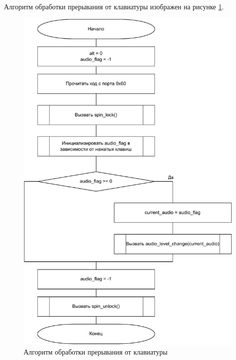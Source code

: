 Алгоритм обработки прерывания от клавиатуры изображен на рисунке \ref{fig:kb_handler}.
\begin{figure}[h!btp]
	\centering
	\includegraphics[scale = 0.9]{inc/diag/kb_handler.pdf}
	\caption{Алгоритм обработки прерывания от клавиатуры}
	\label{fig:kb_handler}	
\end{figure}

\clearpage

